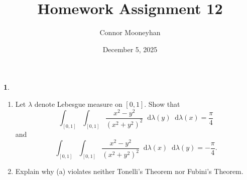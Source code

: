 \documentclass[12pt]{article}
\title{Homework Assignment 12}
\author{Connor Mooneyhan}
\date{December 5, 2025}
\newcommand{\dd}{\mathop{}\!\mathrm{d}}
\theoremstyle{definition}
\newtheorem{ex}{}
\newenvironment{exercise}[1]{
	\renewcommand{\theex}{#1}
	\begin{ex}
		}{\end{ex}}
\begin{document}
\maketitle

\begin{exercise}{5B.1}\
	\begin{enumerate}[label=(\alph*)]
		\item Let $\lambda$ denote Lebesgue measure on $[0, 1]$.
		      Show that \begin{equation*}
			      \int_{[0,1]}\int_{[0,1]} \frac{x^2-y^2}{(x^2+y^2)^2} \dd\lambda(y)\dd\lambda(x) = \frac{\pi}{4}
		      \end{equation*}
		      and \begin{equation*}
			      \int_{[0,1]}\int_{[0,1]} \frac{x^2-y^2}{(x^2+y^2)^2} \dd\lambda(x)\dd\lambda(y) = -\frac{\pi}{4}.
		      \end{equation*}
		\item Explain why (a) violates neither Tonelli's Theorem nor Fubini's Theorem.
	\end{enumerate}
\end{exercise}
\end{document}
